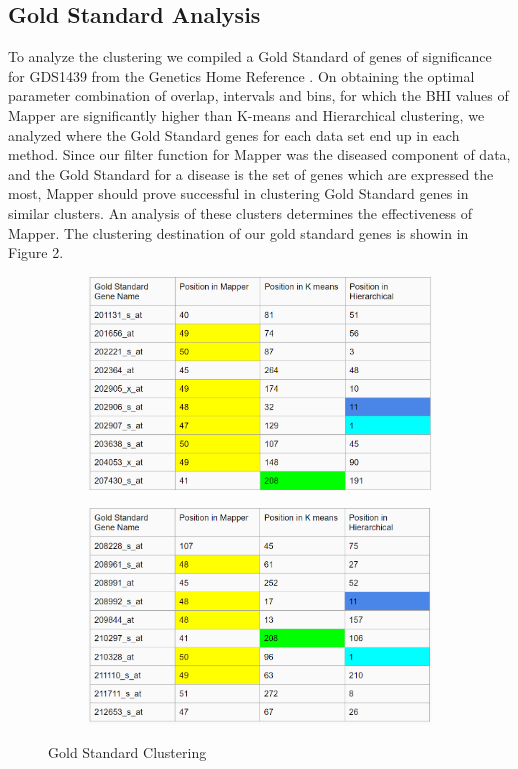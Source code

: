 \documentclass[preprint,10pt]{elsarticle}
\begin{document}
\subsection{Gold Standard Analysis}
	To analyze the clustering we compiled a Gold Standard of genes of significance for GDS1439 from the Genetics Home Reference \cite{pcgenes}. On obtaining the optimal parameter combination of overlap, intervals and bins, for which the BHI values of Mapper are significantly higher than K-means and Hierarchical clustering, we analyzed where the Gold Standard genes for each data set end up in each method. Since our filter function for Mapper was the diseased component of data, and the Gold Standard for a disease is the set of genes which are expressed the most, Mapper should prove successful in clustering Gold Standard genes in similar clusters. An analysis of these clusters determines the effectiveness of Mapper. The clustering destination of our gold standard genes is showin in Figure 2.
\begin{figure}
\centering
\begin{subfigure}{.5\textwidth}
  \centering
  \includegraphics[width=1\linewidth]{goldstandard1.png}
  \label{fig:sub1}
\end{subfigure}%
\begin{subfigure}{.5\textwidth}
  \centering
  \includegraphics[width=1\linewidth]{goldstandard2.png}
  \label{fig:sub2}
\end{subfigure}
\caption{Gold Standard Clustering}
\label{fig:test}
\end{figure}
\end{document}
